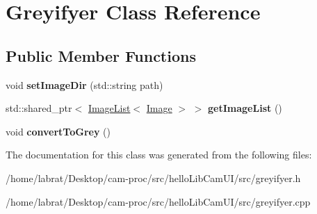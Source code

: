 \hypertarget{classGreyifyer}{}\section{Greyifyer Class Reference}
\label{classGreyifyer}
\subsection*{Public Member Functions}
\begin{DoxyCompactItemize}
\item 
void {\bfseries set\+Image\+Dir} (std\+::string path)\hypertarget{classGreyifyer_a3ecc65a618fe1f7ed2788ee9f2ba5c66}{}\label{classGreyifyer_a3ecc65a618fe1f7ed2788ee9f2ba5c66}

\item 
std\+::shared\+\_\+ptr$<$ \hyperlink{classImageList}{Image\+List}$<$ \hyperlink{classImage}{Image} $>$ $>$ {\bfseries get\+Image\+List} ()\hypertarget{classGreyifyer_ad024a91d058b89e314f5c5a4118bfdce}{}\label{classGreyifyer_ad024a91d058b89e314f5c5a4118bfdce}

\item 
void {\bfseries convert\+To\+Grey} ()\hypertarget{classGreyifyer_a58554aa7ec682f2c335de41392e8f0b4}{}\label{classGreyifyer_a58554aa7ec682f2c335de41392e8f0b4}

\end{DoxyCompactItemize}


The documentation for this class was generated from the following files\+:\begin{DoxyCompactItemize}
\item 
/home/labrat/\+Desktop/cam-\/proc/src/hello\+Lib\+Cam\+U\+I/src/greyifyer.\+h\item 
/home/labrat/\+Desktop/cam-\/proc/src/hello\+Lib\+Cam\+U\+I/src/greyifyer.\+cpp\end{DoxyCompactItemize}
